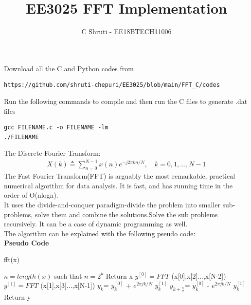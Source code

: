 \documentclass[journal,12pt,twocolumn]{IEEEtran}
\begin{document}
     \def\rightbox#1{\makebox[0in][r]{#1}}
     \def\centbox#1{\makebox[0in]{#1}}
     \def\topbox#1{\raisebox{-\baselineskip}[0in][0in]{#1}}
     \def\midbox#1{\raisebox{-0.5\baselineskip}[0in][0in]{#1}}
\vspace{3cm}
\title{EE3025 FFT Implementation}
\author{C Shruti - EE18BTECH11006}
\maketitle
\newpage
\renewcommand{\thefigure}{\theenumi}
\renewcommand{\thetable}{\theenumi}
\bigskip
Download all the C and Python codes from 
\begin{lstlisting}
https://github.com/shruti-chepuri/EE3025/blob/main/FFT_C/codes
\end{lstlisting}


Run the following commands to compile and then run the C files to generate .dat files
\begin{lstlisting}
gcc FILENAME.c -o FILENAME -lm
./FILENAME
\end{lstlisting}
The Discrete Fourier Transform:
\begin{align}
        X(k) \triangleq \sum_{n=0}^{N-1} x(n) e^{-j 2 \pi k n / N}, \quad k=0,1, \ldots, N-1
\end{align}
The Fast Fourier Transform(FFT) is arguably the most remarkable, practical numerical algorithm for data analysis. It is fast, and has running time in the order of  O(nlogn).\\
It uses the divide-and-conquer paradigm-divide the problem into smaller sub-problems, solve them and combine the solutions.Solve the sub problems recursively. It can be a case of dynamic programming as well.\\
The algorithm can be explained with the following pseudo code:\\

\textbf{Pseudo Code}
\begin{algorithm}
\caption{fft(x)}
\begin{algorithmic} 
\STATE $n = length (x)$ such that $n = 2^k$
\STATE Return x 
\ELSE
\STATE $y^{[0]} =FFT$ (x[0],x[2]...,x[N-2])
\STATE  $y^{[1]}=FFT$ (x[1],x[3]...,x[N-1])
\STATE $y_{k}$= $y_{k}^{[0]}$ + $e^{2\pi jk/N}$ $y_{k}^{[1]}$
\STATE $y_{k+ \frac{n}{2}}$= $y_{k}^{[0]}$ - $e^{2\pi jk/N}$ $y_{k}^{[1]}$
\ENDFOR
\STATE Return y
\ENDIF
\end{algorithmic}
\end{algorithm}
\end{document}
